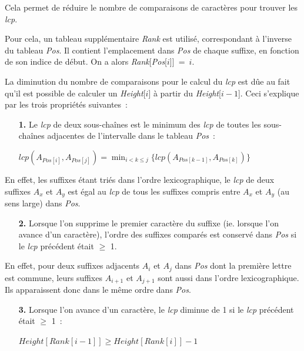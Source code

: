 \documentclass[a4paper,10pt]{article}
\begin{document}
Cela permet de réduire le nombre de comparaisons de caractères pour
trouver les \textit{lcp}.

Pour cela, un tableau supplémentaire \textit{Rank} est utilisé,
correspondant à l'inverse du tableau \textit{Pos}. Il contient
l'emplacement dans \textit{Pos} de chaque suffixe, en fonction de son
indice de début. On a alors \linebreak
\textit{Rank}[\textit{Pos}[$i$]]~=~$i$.

La diminution du nombre de comparaisons pour le calcul du \textit{lcp}
est dûe au fait qu'il est possible de calculer un \textit{Height}[$i$]
à partir du \textit{Height}[$i-1$]. Ceci s'explique par les trois
propriétés suivantes~:

\begin{enumerate}
\item[\textbf{1.}] Le \textit{lcp} de deux sous-chaînes est le minimum des
  \textit{lcp} de toutes les sous-chaînes adjacentes de l'intervalle
  dans le tableau \textit{Pos}~:
  \begin{center}
    $\mathit{lcp}(A_{\mathit{Pos}[i]}, A_{\mathit{Pos}[j]}) =
    \displaystyle\min_{i < k \leq j}
    \{\mathit{lcp}(A_{\mathit{Pos}[k-1]}, A_{\mathit{Pos}[k]})\}$
  \end{center}
\end{enumerate}

En effet, les suffixes étant triés dans l'ordre lexicographique, le
\textit{lcp} de deux suffixes $A_x$ et $A_y$ est égal au \textit{lcp}
de tous les suffixes compris entre $A_x$ et $A_y$ (au sens large) dans
\textit{Pos}.

\begin{enumerate}
\item[\textbf{2.}] Lorsque l'on supprime le premier caractère du suffixe
  (ie. lorsque l'on avance d'un caractère), l'ordre des suffixes
  comparés est conservé dans \textit{Pos} si le \textit{lcp} précédent
  était $\geq$ 1.
\end{enumerate}

En effet, pour deux suffixes adjacents $A_i$ et $A_j$ dans \textit{Pos} dont la
première lettre est commune, leurs suffixes $A_{i+1}$ et $A_{j+1}$
sont aussi dans l'ordre lexicographique. Ils apparaissent donc dans le
même ordre dans \textit{Pos}.

\begin{enumerate}
\item[\textbf{3.}] Lorsque l'on avance d'un caractère, le \textit{lcp}
  diminue de 1 si le \textit{lcp} précédent était $\geq$ 1~:
  \begin{center}
    $\mathit{Height}[\mathit{Rank}[i-1]] \geq
    \mathit{Height}[\mathit{Rank}[i]] - 1$
  \end{center}
\end{enumerate}
\end{document}
